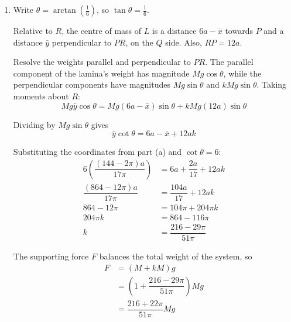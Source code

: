 \documentclass[leqno]{article}
\begin{document}
\begin{enumerate}[
  label=\textbf{\arabic*.},
  leftmargin=*,
  topsep=0pt,
  partopsep=0pt,
  parsep=0pt
]
\begin{djsSolution}
\begin{enumerate}[label=\textbf{(\alph*)}, start=1]
Let the centre of mass of \(L\) be \((\bar{x},\bar{y})\). The lamina is uniform, so areas can be used as weights. If piece \(i\) has area \(\mathcal{A}_i\) and centre of mass \((x_i,y_i)\), then
\[
\mathcal{A}\bar{x}=\sum\mathcal{A}_ix_i,\qquad \mathcal{A}\bar{y}=\sum\mathcal{A}_iy_i
\]

where \(\mathcal{A}=\sum\mathcal{A}_i\), with the area of a removed piece counted as negative.

Taking moments about the \(y\)-axis and about the \(x\)-axis:
\begin{align*}
17\pi a^2\bar{x}
&=18\pi a^2(0)-\pi a^2(2a)
=-2\pi a^3\\
17\pi a^2\bar{y}
&=18\pi a^2\left(\dfrac{8a}{\pi}\right)-\pi a^2(2a)
=(144-2\pi)a^3
\end{align*}

Dividing by \(17\pi a^2\), the exact coordinates are
\[
\left(-\dfrac{2a}{17},\dfrac{(144-2\pi)a}{17\pi}\right)
\]

\item Write \(\theta=\arctan\left(\frac16\right)\), so \(\tan\theta=\frac16\).

Relative to \(R\), the centre of mass of \(L\) is a distance \(6a-\bar{x}\) towards \(P\) and a distance \(\bar{y}\) perpendicular to \(PR\), on the \(Q\) side. Also, \(RP=12a\).

Resolve the weights parallel and perpendicular to \(PR\). The parallel component of the lamina's weight has magnitude \(Mg\cos\theta\), while the perpendicular components have magnitudes \(Mg\sin\theta\) and \(kMg\sin\theta\). Taking moments about \(R\):
\[
Mg\bar{y}\cos\theta
=Mg(6a-\bar{x})\sin\theta+kMg(12a)\sin\theta
\]

Dividing by \(Mg\sin\theta\) gives
\[
\bar{y}\cot\theta=6a-\bar{x}+12ak
\]

Substituting the coordinates from part (a) and \(\cot\theta=6\):
\begin{align*}
6\left(\dfrac{(144-2\pi)a}{17\pi}\right)
&=6a+\dfrac{2a}{17}+12ak\\
\dfrac{(864-12\pi)a}{17\pi}
&=\dfrac{104a}{17}+12ak\\
864-12\pi&=104\pi+204\pi k\\
204\pi k&=864-116\pi\\
k&=\dfrac{216-29\pi}{51\pi}
\end{align*}

The supporting force \(F\) balances the total weight of the system, so
\begin{align*}
F&=(M+kM)g\\
&=\left(1+\dfrac{216-29\pi}{51\pi}\right)Mg\\
&=\dfrac{216+22\pi}{51\pi}Mg
\end{align*}


\end{enumerate}
\end{djsSolution}
\end{enumerate}
\end{document}
